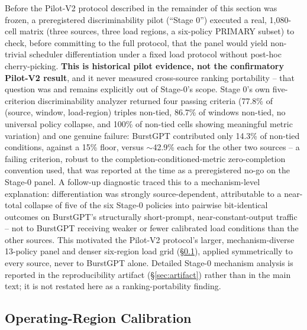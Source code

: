 \documentclass[sn-basic,Numbered,pdflatex]{sn-jnl}
\begin{document}
Before the Pilot-V2 protocol described in the remainder of this section was
frozen, a preregistered discriminability pilot (``Stage 0'') executed a
real, 1,080-cell matrix (three sources, three load regions, a six-policy
PRIMARY subset) to check, before committing to the full protocol, that the
panel would yield non-trivial scheduler differentiation under a fixed load
protocol without post-hoc cherry-picking. \textbf{This
is historical pilot evidence, not the confirmatory Pilot-V2 result}, and it
never measured cross-source ranking portability -- that question was and
remains explicitly out of Stage-0's scope. Stage 0's own five-criterion
discriminability analyzer returned four passing criteria (77.8\% of
(source, window, load-region) triples non-tied, 86.7\% of windows
non-tied, no universal policy collapse, and 100\% of non-tied cells showing
meaningful metric variation) and one genuine failure: BurstGPT contributed
only 14.3\% of non-tied conditions, against a 15\% floor, versus
$\sim$42.9\% each for the other two sources -- a failing criterion, robust
to the completion-conditioned-metric zero-completion convention used, that
was reported at the time as a preregistered no-go on the Stage-0 panel. A
follow-up diagnostic traced this to a
mechanism-level explanation: differentiation was strongly source-dependent,
attributable to a near-total collapse of five of the six Stage-0 policies
into pairwise bit-identical outcomes on BurstGPT's structurally
short-prompt, near-constant-output traffic -- not to BurstGPT receiving
weaker or fewer calibrated load conditions than the other sources. This
motivated the Pilot-V2 protocol's larger, mechanism-diverse 13-policy panel
and denser six-region load grid (\S\ref{sec:calibration}), applied
symmetrically to every source, never to BurstGPT alone. Detailed Stage-0
mechanism analysis is reported in the reproducibility artifact
(\S\ref{sec:artifact}) rather than in the main text; it is not restated
here as a ranking-portability finding.

\subsection{Operating-Region Calibration}
\label{sec:calibration}
\end{document}
